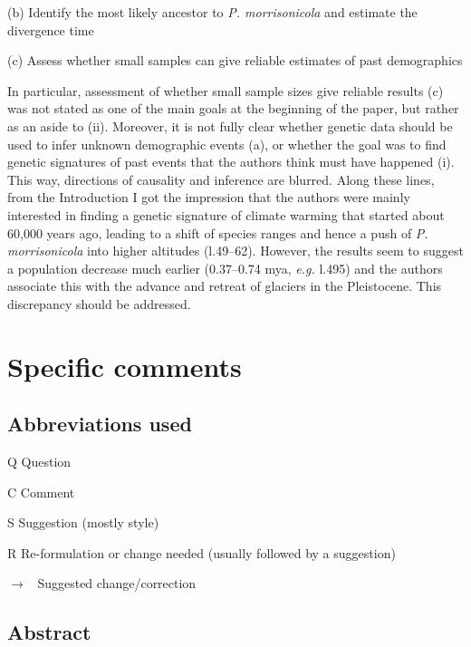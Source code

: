 \documentclass[11pt]{article}
\newenvironment{my_description}
{\begin{description}
  \setlength{\itemsep}{2pt}
  \setlength{\parskip}{0pt}
  \setlength{\parsep}{0pt}}
{\end{description}}
\newenvironment{my_enumerate}
{\begin{enumerate}
  \setlength{\itemsep}{2pt}
  \setlength{\parskip}{0pt}
  \setlength{\parsep}{0pt}}
{\end{enumerate}}
\newcommand{\ra}{$\rightarrow$\ }
\begin{document}
\begin{my_enumerate}
\begin{my_enumerate}
		\item[(b)] Identify the most likely ancestor to \emph{P. morrisonicola} and estimate the divergence time
		\item[(c)] Assess whether small samples can give reliable estimates of past demographics
	\end{my_enumerate} 
	In particular, assessment of whether small sample sizes give reliable results (c) was not stated as one of the main goals at the beginning of the paper, but rather as an aside to (ii). Moreover, it is not fully clear whether genetic data should be used to infer unknown demographic events (a), or whether the goal was to find genetic signatures of past events that the authors think must have happened (i). This way, directions of causality and inference are blurred. Along these lines, from the Introduction I got the impression that the authors were mainly interested in finding a genetic signature of climate warming that started about 60,000 years ago, leading to a shift of species ranges and hence a push of \emph{P. morrisonicola} into higher altitudes (l.49--62). However, the results seem to suggest a population decrease much earlier (0.37--0.74 mya, \emph{e.g.} l.495) and the authors associate this with the advance and retreat of glaciers in the Pleistocene. This discrepancy should be addressed.
\end{my_enumerate}
	

\section{Specific comments}

\subsection{Abbreviations used}
\begin{my_description}
	\item[Q] Question
	\item[C] Comment
	\item[S] Suggestion (mostly style)
	\item[R] Re-formulation or change needed (usually followed by a suggestion)
	\item[\ra] Suggested change/correction
\end{my_description}


\subsection{Abstract}
\end{document}
